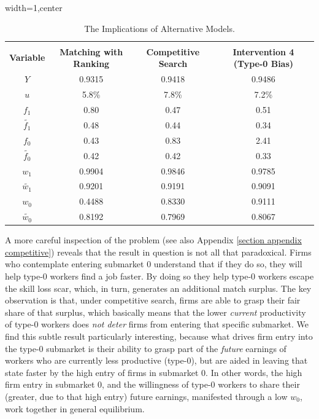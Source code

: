 \documentclass[12pt]{article} %
\theoremstyle{definition}
\begin{document}
\begin{table}[h!]

\begin{adjustbox}{width=1\columnwidth,center}

 \begin{tabular}{||c c c c||} 
 \hline
 \\[-1.1em]
 \textbf{Variable} & \textbf{Matching with Ranking} & \textbf{Competitive Search} & \textbf{Intervention 4 (Type-0 Bias)}\\  
 \hline\hline
  $Y$  & 0.9315 & 0.9418 & 0.9486  \\ 
  $u$  & 5.8\% & 7.8\% & 7.2\%\\ 
  $f_{1}$  & 0.80 & 0.47 & 0.51  \\ 
  $\tilde{f_{1}}$  & 0.48 & 0.44 & 0.34 \\
  $f_{0}$  &  0.43 & 0.83 & 2.41 \\
  $\tilde{f_{0}}$  & 0.42 & 0.42 & 0.33  \\
  $w_{1}$  & 0.9904 & 0.9846 & 0.9785 \\
  $\tilde{w_{1}}$ & 0.9201 & 0.9191 & 0.9091 \\
  $w_{0}$  & 0.4488 & 0.8330 & 0.9111 \\
  $\tilde{w_{0}}$ & 0.8192 & 0.7969 & 0.8067  \\ [1ex] 
 \hline
 \end{tabular}
\end{adjustbox}
\centering
     \captionsetup{justification=centering}
\caption{The Implications of Alternative Models.} \label{table_comparison}
\end{table} 

A more careful inspection of the problem (see also Appendix \ref{section appendix competitive}) reveals that the result in question is not all that paradoxical. Firms who contemplate entering submarket 0 understand that if they do so, they will help type-0 workers find a job faster. By doing so they help type-0 workers escape the skill loss scar, which, in turn, generates an additional match surplus. The {key} observation is that, under competitive search, firms are able to grasp their fair share of that surplus, which basically means that the lower \textit{current} productivity of type-0 workers does \textit{not deter} firms from entering that specific submarket. We find this subtle result particularly interesting, because what drives firm entry into the type-0 submarket is their ability to grasp part of the \textit{future} earnings of workers who are currently less productive (type-0), but are aided in leaving that state faster by the high entry of firms in submarket 0. In other words, the high firm entry in submarket 0, and the willingness of type-0 workers to share their (greater, due to that high entry) future earnings, manifested through a low $w_0$, work together in general equilibrium. 
\end{document}
